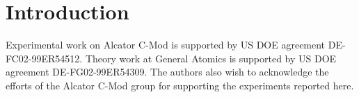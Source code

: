 \documentclass[12pt,floatfix,showpacs]{revtex4-1}
\begin{document}
\section{Introduction}\label{sec:intro}


\begin{acknowledgments}
 Experimental work on Alcator C-Mod is supported by US DOE agreement DE-FC02-99ER54512. Theory work at General Atomics is supported by US DOE agreement DE-FG02-99ER54309.  The authors also wish to acknowledge the efforts of the Alcator C-Mod group for supporting the experiments reported here.
\end{acknowledgments}



\end{document}
